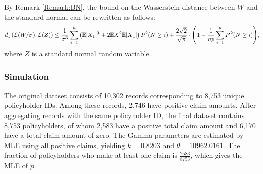 \documentclass[pdflatex,sn-mathphys-ay]{sn-jnl}
\newcommand{\rcolor}[1]{\textcolor{red}{#1}}
\newcommand{\todoA}[1]{\todo[color=yellow!50]{#1}}
\newcommand{\E}{\mathbb{E}}
\newcommand{\Var}{\mathrm{Var}}
\newtheorem{corollary}[theorem]{Corollary}
\theoremstyle{thmstyleone}%
\theoremstyle{thmstyletwo}%
\theoremstyle{thmstylethree}%
\begin{document}
By Remark \ref{Remark:BN}, the bound on the Wasserstein distance between $W$ and the standard normal can be rewritten as follows: \begin{align}
    \label{Remark-insurance}d_1\left(\mathcal{L}(W/{\sigma}), \mathcal{L}(Z) \right)\le \frac{1}{\sigma^3}\sum_{i=1}^{n} \left(\E|X_1|^3 + 2\E X_1^2 \E|X_1|\right) P^2(N \ge i)  +{2\sqrt{2} \over \sqrt{\pi}}\cdot\displaystyle{\left(1-{1\over np}\sum_{i=1}^nP^2(N\ge i)\right)},
    \end{align} where $Z$ is a standard normal random variable.

\subsubsection{Simulation} 


The original dataset \citep{Xiaomeng} consists of 10,302 records corresponding to 8,753 unique policyholder IDs. Among these records, 2,746 have positive claim amounts. After aggregating records with the same policyholder ID, the final dataset contains 8,753 policyholders, of whom 2,583 have a positive total claim amount and 6,170 have a total claim amount of zero. The Gamma parameters are estimated by MLE using all positive claims, yielding $k=0.8203$ and $\theta=10962.0161$. The fraction of policyholders who make at least one claim is $\frac{2583}{8753}$, which gives the MLE of $p$.
\end{document}
